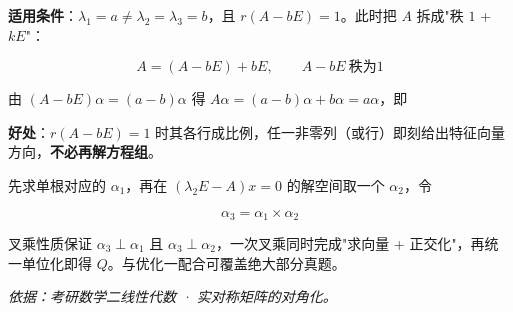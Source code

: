\documentclass[11pt,a4paper]{ctexart}
\begin{document}

\textbf{适用条件}：$\lambda_1=a\neq\lambda_2=\lambda_3=b$，且 $r(A-bE)=1$。此时把 $A$ 拆成"秩 $1$ + $kE$"：

\[
A=(A-bE)+bE,\qquad A-bE\ \text{秩为}1
\]

由 $(A-bE)\alpha=(a-b)\alpha$ 得 $A\alpha=(a-b)\alpha+b\alpha=a\alpha$，即


\textbf{好处}：$r(A-bE)=1$ 时其各行成比例，任一非零列（或行）即刻给出特征向量方向，\textbf{不必再解方程组}。


先求单根对应的 $\alpha_1$，再在 $(\lambda_2E-A)x=0$ 的解空间取一个 $\alpha_2$，令

\[
\alpha_3=\alpha_1\times\alpha_2
\]

叉乘性质保证 $\alpha_3\perp\alpha_1$ 且 $\alpha_3\perp\alpha_2$，一次叉乘同时完成"求向量 + 正交化"，再统一单位化即得 $Q$。与优化一配合可覆盖绝大部分真题。







\par\addvspace{3pt}\par\addvspace{3pt}

\emph{依据：考研数学二线性代数 · 实对称矩阵的对角化。}
\end{document}

